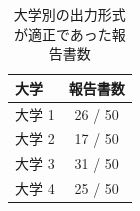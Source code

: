 \begin{table}[h]
\begin{center}
\caption{大学別の出力形式が適正であった報告書数} \label{tab:report}
\begin{tabular}{lc}
大学 & 報告書数 \\
\hline
大学 1 & 26 / 50 \\
大学 2 & 17 / 50 \\
大学 3 & 31 / 50 \\
大学 4 & 25 / 50 \\
\end{tabular}
\end{center}
\end{table}
